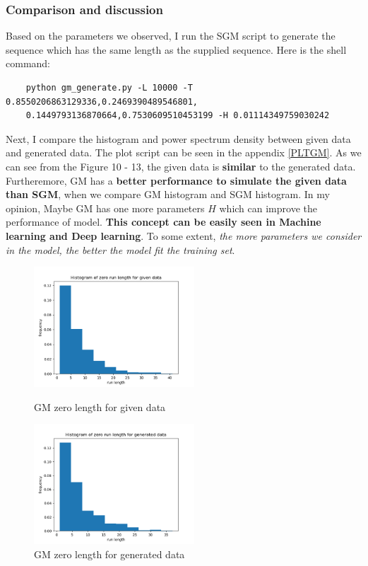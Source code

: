 \documentclass[11pt]{article}
\begin{document}
\subsubsection{Comparison and discussion}
Based on the parameters we observed, I run the SGM script to generate the sequence which has the same length as the supplied sequence.
Here is the shell command:
\begin{verbatim}
    python gm_generate.py -L 10000 -T 0.8550206863129336,0.2469390489546801,
    0.1449793136870664,0.7530609510453199 -H 0.01114349759030242
\end{verbatim}
Next, I compare the histogram and power spectrum density between given data and generated data. The plot script can be seen in the appendix \ref{PLTGM}.
As we can see from the Figure 10 - 13, the given data is \textbf{similar} to the generated data. 
Furtheremore, GM has a \textbf{better performance to simulate the given data than SGM}, when we compare GM histogram and SGM histogram.
In my opinion, Maybe GM has one more parameters $H$ which can improve the performance of model.
\textbf{This concept can be easily seen in Machine learning and Deep learning}. To some extent, \emph{the more parameters we consider in the model, the better the model fit the training set}.
\begin{figure}[htbp]
    \centering
    \begin{minipage}[t]{0.48\textwidth}
    \centering
    \includegraphics[width=6cm]{GM_Histogram_of_zero_run_length_for_given_data.png}
    \caption{GM zero length for given data}
    \end{minipage}
    \begin{minipage}[t]{0.48\textwidth}
    \centering
    \includegraphics[width=6cm]{GM_Histogram_of_zero_run_length_for_generated_data.png}
    \caption{GM zero length for generated data}
    \end{minipage}
\end{figure}
\end{document}
